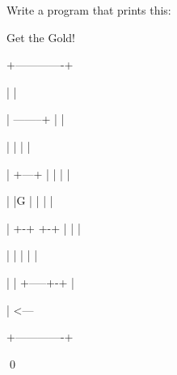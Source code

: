 Write a program that prints this:

\begin{console}

Get the Gold!

+-------------+

|             |

| --------+ | |  

|         | | |

| +---+ | | | |

| |G  | | |   |

| +-+ +-+ | | |

| | |       | |

| | +-----+-+ |

|               <---

+-------------+

\end{console}

\qed

